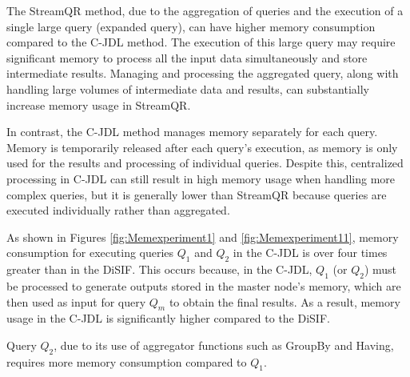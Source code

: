 \documentclass[5p,times]{elsarticle}
\begin{document}



The StreamQR method, due to the aggregation of queries and the execution of a single
 large query (expanded query), can have higher memory consumption compared
  to the C-JDL method. The execution of this large query may require significant
   memory to process all the input data simultaneously and store intermediate results.
    Managing and processing the aggregated query, along with handling large volumes
     of intermediate data and results, can substantially increase memory usage in StreamQR.


In contrast, the C-JDL method manages memory separately for each query.
 Memory is temporarily released after each query's execution, as memory is only used 
 for the results and processing of individual queries. Despite this, centralized processing
  in C-JDL can still result in high memory usage when handling more complex queries,
   but it is generally lower than StreamQR because queries are executed individually rather
    than aggregated.


As shown in Figures \ref{fig:Memexperiment1} and \ref{fig:Memexperiment11}, memory consumption for executing queries
 $Q_1$ and $Q_2$ in the C-JDL is over four times greater than in
  the DiSIF. This occurs because, in the C-JDL,
   $Q_1$ (or $Q_2$) must be processed to generate outputs stored in the master node's memory,
    which are then used as input for query $Q_m$ to obtain the final results.
     As a result, memory usage in the C-JDL is significantly higher compared to
      the DiSIF.


Query $Q_2$, due to its use of aggregator functions such as GroupBy and Having,
 requires more memory consumption compared to $Q_1$.
\end{document}
